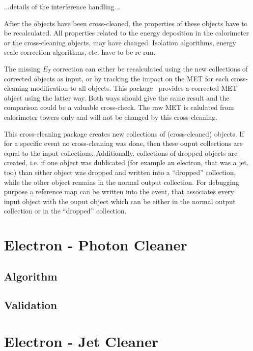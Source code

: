 \documentclass{cmspaper}
\begin{document}
...details of the interference handling...


After the objects have been cross-cleaned, the properties of these objects have to 
be recalculated. All properties related to the energy deposition in the
calorimeter or the cross-cleaning objects, may have changed. Isolation
algorithms, energy scale correction algorithms, etc. have to be re-run.

The missing $E_T$ correction can either be recalculated using the new
collections of corrected objects as input, or by tracking the impact on the MET for each
cross-cleaning modification to all objects. This package~\cite{package} provides a corrected MET
object using the latter way. Both ways should give the same result and
the comparison could be a valuable cross-check. The raw MET is calulated from
calorimeter towers only and will not be changed by this cross-cleaning.

This cross-cleaning package creates new collections of (cross-cleaned) objects.
If for a specific event no cross-cleaning was done, then these ouput
collections are equal to the input collections. Additionally, collections of
dropped objects are created, i.e. if one object was dublicated (for example an
electron, that was a jet, too) than either object was dropped and written into
a ``dropped'' collection, while the other object remains in the normal output
collection.
For debugging purpose a reference map can be written into the event, that
associates every input object with the ouput object which can be either in the
normal output collection or in the ``dropped'' collection.

\section{Electron - Photon Cleaner}
\subsection{Algorithm}
\subsection{Validation}

\section{Electron - Jet Cleaner}%
\end{document}
